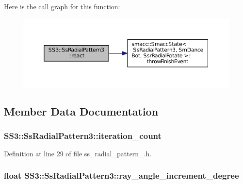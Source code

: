 Here is the call graph for this function\+:
\nopagebreak
\begin{figure}[H]
\begin{center}
\leavevmode
\includegraphics[width=350pt]{structSS3_1_1SsRadialPattern3_a08f3b13465490f4e3f0b4d0f4a8618a6_cgraph}
\end{center}
\end{figure}




\subsection{Member Data Documentation}
\subsubsection[{\texorpdfstring{iteration\+\_\+count}{iteration_count}}]{ S\+S3\+::\+Ss\+Radial\+Pattern3\+::iteration\+\_\+count}\hypertarget{structSS3_1_1SsRadialPattern3_ad25155ad725a7e70daa88a1728d30bc4}{}\label{structSS3_1_1SsRadialPattern3_ad25155ad725a7e70daa88a1728d30bc4}


Definition at line 29 of file ss\+\_\+radial\+\_\+pattern\+\_.\+h.

\subsubsection[{\texorpdfstring{ray\+\_\+angle\+\_\+increment\+\_\+degree}{ray_angle_increment_degree}}]{\setlength{\rightskip}{0pt plus 5cm}float S\+S3\+::\+Ss\+Radial\+Pattern3\+::ray\+\_\+angle\+\_\+increment\+\_\+degree}\hypertarget{structSS3_1_1SsRadialPattern3_ae101e32616d7c9787f91aeb4ecf2c400}{}\label{structSS3_1_1SsRadialPattern3_ae101e32616d7c9787f91aeb4ecf2c400}


